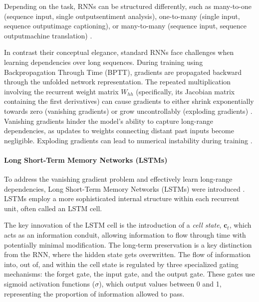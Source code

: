Depending on the task, RNNs can be structured differently, such as many-to-one (sequence input, single output\textemdash sentiment analysis), one-to-many (single input, sequence output\textemdash image captioning), or many-to-many (sequence input, sequence output\textemdash machine translation) \auto.

In contrast their conceptual elegance, standard RNNs face challenges when learning dependencies over long sequences. During training using Backpropagation Through Time (BPTT), gradients are propagated backward through the unfolded network representation. The repeated multiplication involving the recurrent weight matrix \( W_{hh} \) (specifically, its Jacobian matrix containing the first derivatives) can cause gradients to either shrink exponentially towards zero (vanishing gradients) or grow uncontrollably (exploding gradients) \autocite{hochreiter1998vanishing}. Vanishing gradients hinder the model's ability to capture long-range dependencies, as updates to weights connecting distant past inputs become negligible. Exploding gradients can lead to numerical instability during training \autocite{philipp2017exploding}.

\paragraph{\textbf{Long Short-Term Memory Networks (LSTMs)}}
\label{sec:lstm}

To address the vanishing gradient problem and effectively learn long-range dependencies, Long Short-Term Memory Networks (LSTMs) were introduced \autocite{hochreiter1997long}. LSTMs employ a more sophisticated internal structure within each recurrent unit, often called an LSTM cell.

The key innovation of the LSTM cell is the introduction of a \textit{cell state}, \( \bm{c}_t \), which acts as an information conduit, allowing information to flow through time with potentially minimal modification. The long-term preservation is a key distinction from the RNN, where the hidden state gets overwritten. The flow of information into, out of, and within the cell state is regulated by three specialized gating mechanisms: the forget gate, the input gate, and the output gate. These gates use sigmoid activation functions (\(\sigma\)), which output values between 0 and 1, representing the proportion of information allowed to pass.

